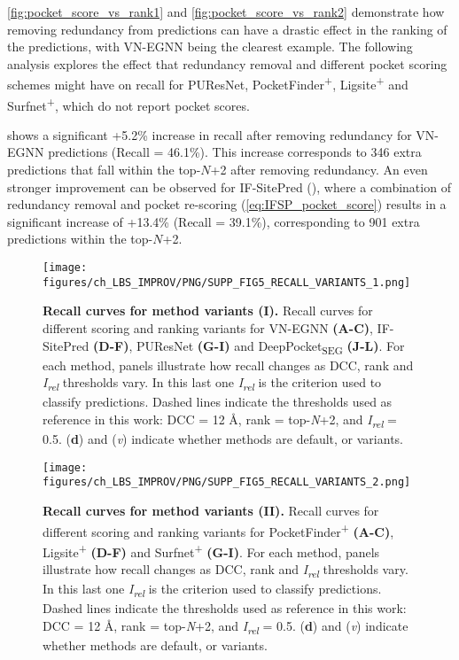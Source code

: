 \autoref{fig:pocket_score_vs_rank1} and \autoref{fig:pocket_score_vs_rank2} demonstrate how removing redundancy from predictions can have a drastic effect in the ranking of the predictions, with VN-EGNN being the clearest example. The following analysis explores the effect that redundancy removal and different pocket scoring schemes might have on recall for PUResNet, PocketFinder\textsuperscript{+}, Ligsite\textsuperscript{+} and Surfnet\textsuperscript{+}, which do not report pocket scores.

 shows a significant +5.2\% increase in recall after removing redundancy for VN-EGNN predictions (Recall = 46.1\%). This increase corresponds to 346 extra predictions that fall within the top-$N$+2 after removing redundancy. An even stronger improvement can be observed for IF-SitePred (), where a combination of redundancy removal and pocket re-scoring (\autoref{eq:IFSP_pocket_score}) results in a significant increase of +13.4\% (Recall = 39.1\%), corresponding to 901 extra predictions within the top-$N$+2.

\begin{figure}[htbp!]
    \centering
    \texttt{[image: figures/ch\_LBS\_IMPROV/PNG/SUPP\_FIG5\_RECALL\_VARIANTS\_1.png]}
    \caption[Recall curves for method variants (I)]{\textbf{Recall curves for method variants (I).} Recall curves for different scoring and ranking variants for VN-EGNN \textbf{(A-C)}, IF-SitePred \textbf{(D-F)}, PUResNet \textbf{(G-I)} and DeepPocket\textsubscript{SEG} \textbf{(J-L)}. For each method, panels illustrate how recall changes as DCC, rank and \textit{I\textsubscript{rel}} thresholds vary. In this last one \textit{I\textsubscript{rel}} is the criterion used to classify predictions. Dashed lines indicate the thresholds used as reference in this work: DCC = 12 \AA{}, rank = top-\textit{N}+2, and \textit{I\textsubscript{rel}} = 0.5. (\textbf{d}) and (\textit{v}) indicate whether methods are default, or variants.}
    \label{fig:pocker_recall_variants1}
\end{figure}

\begin{figure}[htbp!]
    \centering
    \texttt{[image: figures/ch\_LBS\_IMPROV/PNG/SUPP\_FIG5\_RECALL\_VARIANTS\_2.png]}
    \caption[Recall curves for method variants (II)]{\textbf{Recall curves for method variants (II).} Recall curves for different scoring and ranking variants for PocketFinder\textsuperscript{+} \textbf{(A-C)}, Ligsite\textsuperscript{+} \textbf{(D-F)} and Surfnet\textsuperscript{+} \textbf{(G-I)}. For each method, panels illustrate how recall changes as DCC, rank and \textit{I\textsubscript{rel}} thresholds vary. In this last one \textit{I\textsubscript{rel}} is the criterion used to classify predictions. Dashed lines indicate the thresholds used as reference in this work: DCC = 12 \AA{}, rank = top-\textit{N}+2, and \textit{I\textsubscript{rel}} = 0.5. (\textbf{d}) and (\textit{v}) indicate whether methods are default, or variants.}
    \label{fig:pocker_recall_variants2}
\end{figure}

